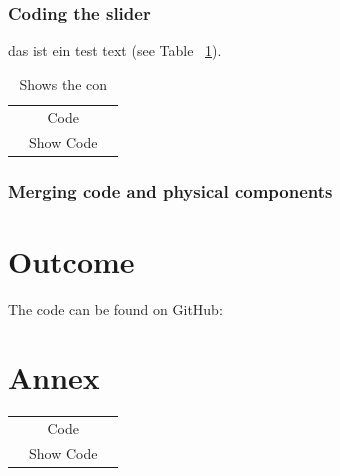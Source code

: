 \documentclass[12pt,twoside,a4paper]{article}
\begin{document}
    \subsubsection{Coding the slider}
        \begin{flushleft}
        das ist ein test text (see Table ~\ref{tab:test}).\newline
        \end{flushleft}

        \begin{table}[h]
            \centering
            \begin{tabular}[h]{ccc}
                & Code &  \\
                & Show Code &  \\
            \end{tabular}
            \caption{Shows the con}
            \label{tab:test}
        \end{table}
        \begin{flushleft}
        \end{flushleft}


    \subsubsection{Merging code and physical components}
        \begin{flushleft}
        \end{flushleft}

    \section{Outcome}
        \begin{flushleft}

            The code can be found on GitHub: 
        \end{flushleft}
        
    \newpage
     
    

    \newpage
    \section{Annex}

        \begin{tabular}[h]{ccc}
            & Code &  \\
            & Show Code &  \\
        \end{tabular}
\end{document}
